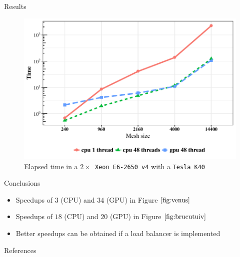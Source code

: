 \documentclass{beamer}
\begin{document}
\begin{frame}[fragile]
\begin{columns}[T]
\begin{column}{.46\textwidth}
\begin{block}{Results}
\begin{figure}[ht]
	\centering
	\includegraphics[scale=1.4]{total_brucutuiv.pdf}
	\caption{Elapsed time in a \texttt{$2\times$ Xeon E6-2650 v4} with a \texttt{Tesla K40}}
	\label{fig:brucutuiv}
\end{figure}

\end{block}

\begin{block}{Conclusions}\justifying
\begin{itemize}

\item Speedups of $3$ (CPU) and $34$ (GPU) in Figure $\ref{fig:venus}$
\item Speedups of $18$ (CPU) and $20$ (GPU) in Figure $\ref{fig:brucutuiv}$
\item Better speedups can be obtained if a load balancer is implemented 


\end{itemize}
\end{block}


\begin{block}{References}
%

{\footnotesize
}
%
%
%
\end{block}

\end{column}
\end{columns}


\end{frame}
\end{document}
